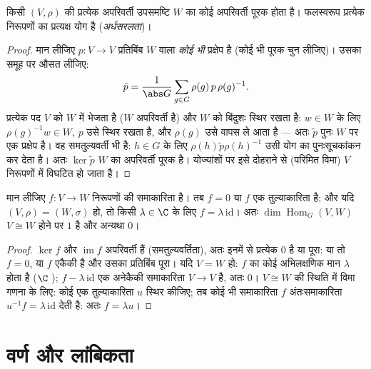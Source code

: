 \begin{theorem}[मास्के]\label{thm:b3:representations:maschke}
किसी  $(V, \rho)$ की प्रत्येक अपरिवर्ती उपसमष्टि $W$ का कोई
अपरिवर्ती पूरक होता है। फलस्वरूप प्रत्येक  
निरूपणों का प्रत्यक्ष योग है
(\emph{अर्धसरलता})।
\end{theorem}

\begin{proof}
मान लीजिए $p \colon V \to V$ प्रतिबिंब $W$ वाला \emph{कोई भी} प्रक्षेप है
(कोई भी पूरक चुन लीजिए)। उसका समूह पर औसत लीजिए:
\[
\tilde p = \frac1{\abs G}\sum_{g \in G} \rho(g)\,p\,\rho(g)^{-1}.
\]
प्रत्येक पद $V$ को $W$ में भेजता है ($W$ अपरिवर्ती है) और
$W$ को बिंदुशः स्थिर रखता है: $w \in W$ के लिए $\rho(g)^{-1}w \in W$, $p$ उसे स्थिर
रखता है, और $\rho(g)$ उसे वापस ले आता है --- अतः $\tilde p$ पुनः $W$ पर
एक प्रक्षेप है। वह समतुल्यवर्ती भी है: $h \in G$ के लिए $\rho(h)\tilde p\rho(h)^{-1}$ उसी योग
का पुनःसूचकांकन कर देता है। अतः $\ker
\tilde p$ $W$ का अपरिवर्ती पूरक है।
योज्यांशों पर इसे दोहराने से (परिमित विमा) $V$ 
निरूपणों में विघटित हो जाता है।
\end{proof}

\begin{theorem}[शूर की प्रमेयिका]\label{thm:b3:representations:schur}
मान लीजिए $f \colon V \to W$ \emph{} निरूपणों की समाकारिता है। तब
$f = 0$ या $f$ एक तुल्याकारिता है; और यदि $(V,\rho) = (W,\sigma)$ हो, तो किसी $\lambda \in \C$
के लिए $f = \lambda\,\mathrm{id}$। अतः $\dim\operatorname{Hom}_G(V, W)$ $V \cong W$ होने पर $1$ है और अन्यथा
$0$।
\end{theorem}

\begin{proof}
$\ker f$ और $\operatorname{im} f$ अपरिवर्ती हैं (समतुल्यवर्तिता), अतः इनमें से
प्रत्येक $0$ है या पूरा: या तो $f = 0$, या $f$ एकैकी है और उसका
प्रतिबिंब पूरा। यदि $V = W$ हो: $f$ का कोई अभिलक्षणिक मान $\lambda$
होता है ($\C$ ); $f - \lambda\,\mathrm{id}$ एक अनेकैकी समाकारिता
$V \to V$ है, अतः $0$। $V \cong W$ की स्थिति में विमा गणना के लिए: कोई एक
तुल्याकारिता $u$ स्थिर कीजिए; तब कोई भी समाकारिता $f$
अंतःसमाकारिता $u^{-1}f = \lambda\,\mathrm{id}$ देती है: अतः $f =
\lambda u$।
\end{proof}

\section{वर्ण और लांबिकता}

